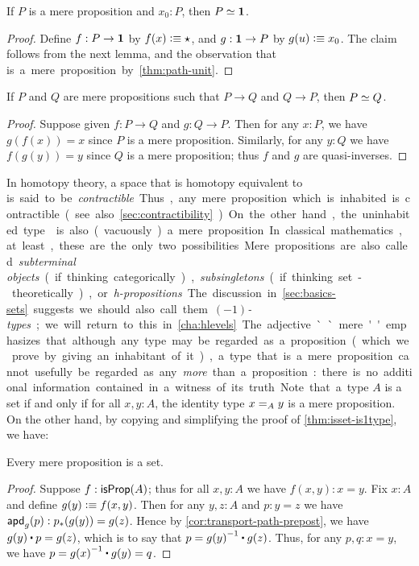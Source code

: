 \begin{lem}\label{thm:inhabprop-eqvunit}
  If $P$ is a mere proposition and $x_0:P$, then $\eqv P \unit$.
\end{lem}
\begin{proof}
  Define $f:P\to\unit$ by $f(x)\defeq \ttt$, and $g:\unit\to P$ by $g(u)\defeq x_0$.
  The claim follows from the next lemma, and the observation that \unit is a mere proposition by \autoref{thm:path-unit}.
\end{proof}

\begin{lem}\label{lem:equiv-iff-hprop}
  If $P$ and $Q$ are mere propositions such that $P\to Q$ and $Q\to P$, then $\eqv P Q$.
\end{lem}
\begin{proof}
  Suppose given $f:P\to Q$ and $g:Q\to P$.
  Then for any $x:P$, we have $g(f(x))=x$ since $P$ is a mere proposition.
  Similarly, for any $y:Q$ we have $f(g(y))=y$ since $Q$ is a mere proposition; thus $f$ and $g$ are quasi-inverses.
\end{proof}

In homotopy theory, a space that is homotopy equivalent to \unit is said to be \emph{contractible}.
Thus, any mere proposition which is inhabited is contractible (see also \autoref{sec:contractibility}).
On the other hand, the uninhabited type \emptyt is also (vacuously) a mere proposition.
In classical mathematics, at least, these are the only two possibilities.

Mere propositions are also called \emph{subterminal objects} (if thinking categorically), \emph{subsingletons} (if thinking set-theoretically), or \emph{h-propositions}.
The discussion in \autoref{sec:basics-sets} suggests we should also call them \emph{$(-1)$-types}; we will return to this in \autoref{cha:hlevels}.
The adjective ``mere'' emphasizes that although any type may be regarded as a proposition (which we prove by giving an inhabitant of it), a type that is a mere proposition cannot usefully be regarded as any \emph{more} than a proposition: there is no additional information contained in a witness of its truth.

Note that a type $A$ is a set if and only if for all $x,y:A$, the identity type $\id[A]xy$ is a mere proposition.
On the other hand, by copying and simplifying the proof of \autoref{thm:isset-is1type}, we have:

\begin{lem}\label{thm:prop-set}
  Every mere proposition is a set.
\end{lem}
\begin{proof}
  Suppose $f:\isprop(A)$; thus for all $x,y:A$ we have $f(x,y):x=y$.  Fix $x:A$
  and define $g(y)\defeq f(x,y)$.   Then for any $y,z:A$ and $p:y=z$ we have $\apd
  g p : \trans{p}{g(y)}={g(z)}$.  Hence by \autoref{cor:transport-path-prepost}, we have
  $g(y)\ct p = g(z)$, which is to say that $p=\opp{g(y)}\ct g(z)$.  Thus, for
  any $p,q:x=y$, we have $p = \opp{g(x)}\ct g(y) = q$.
\end{proof}

